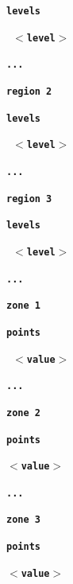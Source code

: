 \documentclass[12pt]{report}
\begin{document}
\textbf{\texttt{levels}}

\textbf{\texttt{ \begin{math}<\end{math}level\begin{math}>\end{math}}}


\textbf{\texttt{...}}

\textbf{\texttt{region 2}}

\textbf{\texttt{levels}}

\textbf{\texttt{ \begin{math}<\end{math}level\begin{math}>\end{math}}}

\textbf{\texttt{...}}

\textbf{\texttt{region 3}}

\textbf{\texttt{levels}}

\textbf{\texttt{ \begin{math}<\end{math}level\begin{math}>\end{math}}}

\textbf{\texttt{...}}

\textbf{\texttt{zone 1}}

\textbf{\texttt{points}}

\textbf{\texttt{ \begin{math}<\end{math}value\begin{math}>\end{math}}}

\textbf{\texttt{...}}

\textbf{\texttt{zone 2}}

\textbf{\texttt{points}}

\textbf{\texttt{\begin{math}<\end{math}value\begin{math}>\end{math}}}

\textbf{\texttt{...}}

\textbf{\texttt{zone 3}}

\textbf{\texttt{points}}

\textbf{\texttt{\begin{math}<\end{math}value\begin{math}>\end{math}}}
\end{document}
